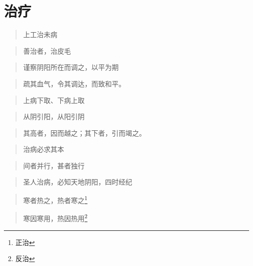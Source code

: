 \section{治疗}

\begin{quote}
  上工治未病
\end{quote}
\begin{quote}
  善治者，治皮毛
\end{quote}
\begin{quote}
  谨察阴阳所在而调之，以平为期
\end{quote}
\begin{quote}
  疏其血气，令其调达，而致和平。
\end{quote}
\begin{quote}
  上病下取、下病上取
\end{quote}
\begin{quote}
  从阴引阳，从阳引阴
\end{quote}
\begin{quote}
  其高者，因而越之；其下者，引而竭之。
\end{quote}
\begin{quote}
  治病必求其本
\end{quote}
\begin{quote}
  间者并行，甚者独行
\end{quote}
\begin{quote}
  圣人治病，必知天地阴阳，四时经纪
\end{quote}
\begin{quote}
  寒者热之，热者寒之\footnote{正治}
\end{quote}
\begin{quote}
  寒因寒用，热因热用\footnote{反治}
\end{quote}
